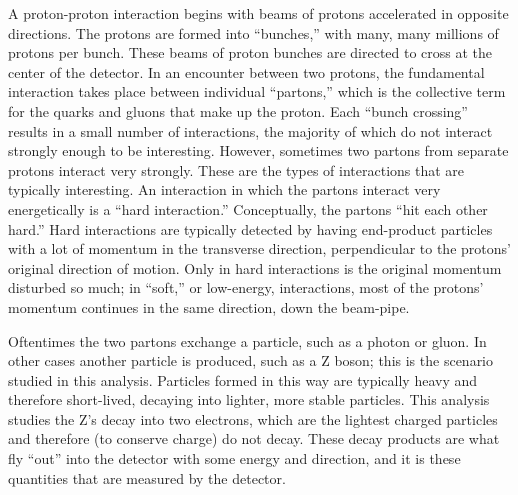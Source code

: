 A proton-proton interaction begins 
with beams of protons accelerated 
in opposite directions.  
The protons are formed into ``bunches,'' 
with many, many millions of protons per bunch.  
These beams of proton bunches are directed to 
cross at the center of the detector.  
In an encounter between two protons, 
the fundamental interaction takes place 
between individual ``partons,'' 
which is the collective term for 
the quarks and gluons that make up the proton.  
Each ``bunch crossing'' results in 
a small number of interactions, 
the majority of which do not interact 
strongly enough to be interesting.  
However, sometimes two partons %
from separate protons interact very strongly.  
These are the types of interactions 
that are typically interesting.  
An interaction in which the partons interact 
very energetically is a ``hard interaction.''  
Conceptually, the partons ``hit each other hard.''  
Hard interactions are typically detected 
by having end-product particles with 
a lot of momentum 
in the transverse direction, 
perpendicular to the protons' original 
direction of motion.  
Only in hard interactions is the original 
momentum disturbed so much; 
in ``soft,'' or low-energy, interactions, 
most of the protons' momentum 
continues in the same direction, 
down the beam-pipe.  

Oftentimes the two partons exchange 
a particle, such as a photon or gluon.  
In other cases another particle is produced, %
such as a Z boson; 
this is the scenario 
studied in this analysis.  
Particles formed in this way 
are typically heavy and therefore 
short-lived, 
decaying into lighter, more stable particles.  
This analysis studies the Z's decay into two 
electrons, 
which are the lightest charged particles 
and therefore (to conserve charge) 
do not decay.  
These decay products are what fly ``out'' 
into the detector with 
some energy and direction, 
and it is these quantities 
that are measured by the detector.  

